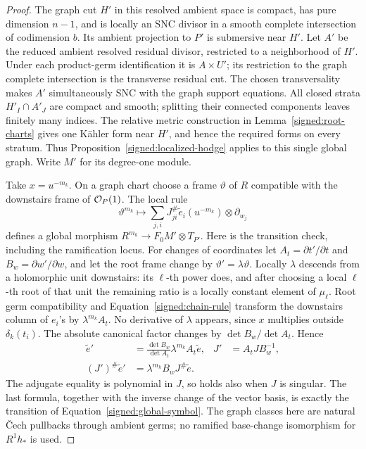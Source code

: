 \begin{proof}
The graph cut \(H'\) in this resolved ambient space is compact,
has pure dimension \(n-1\), and is locally an SNC divisor in
a smooth complete intersection of codimension \(b\).  Its
ambient projection to \(P'\) is submersive near \(H'\).
Let \(A'\) be the reduced ambient resolved residual divisor, restricted
to a neighborhood of \(H'\).  Under each product-germ identification
it is \(A\times U'\); its restriction to the graph complete intersection
is the transverse residual cut.  The chosen transversality makes \(A'\)
simultaneously SNC with the graph support equations.
All closed strata \(H'_I\cap A'_J\) are compact and smooth;
splitting their connected components leaves finitely many
indices.  The relative metric construction in
Lemma~\ref{signed:root-charts} gives one Kähler form near
\(H'\), and hence the required forms on every stratum.  Thus
Proposition~\ref{signed:localized-hodge} applies to this single
global graph.  Write \(M'\) for its degree-one module.

Take \(x=u^{-m_k}\).  On a graph chart choose a frame
\(\vartheta\) of \(R\) compatible with the downstairs frame
of \(\mathcal O_P(1)\).  The local rule
\begin{equation}\label{signed:global-symbol}
 \vartheta^{m_k}\longmapsto
 \sum_{j,i}J^\#_{ji}\widetilde e_i(u^{-m_k})
                    \otimes\partial_{w_j}
\end{equation}
defines a global morphism
\(R^{m_k}\to F_0M'\otimes T_{P'}\).  Here is the transition
check, including the ramification locus.  For changes of
coordinates let \(A_t=\partial t'/\partial t\) and
\(B_w=\partial w'/\partial w\), and let the root frame change
by \(\vartheta'=\lambda\vartheta\).  Locally \(\lambda\)
descends from a holomorphic unit downstairs: its \(\ell\)-th
power does, and after choosing a local \(\ell\)-th root of
that unit the remaining ratio is a locally constant element
of \(\mu_\ell\).  Root germ compatibility and
Equation~\eqref{signed:chain-rule} transform the downstairs
column of \(e_i\)'s by \(\lambda^{m_k}A_t\).  No derivative
of \(\lambda\) appears, since \(x\) multiplies outside
\(\delta_k(t_i)\).  The absolute canonical factor changes
by \(\det B_w/\det A_t\).  Hence
\[
\begin{aligned}
 \widetilde e'&=\frac{\det B_w}{\det A_t}\lambda^{m_k}A_t\widetilde e,
 &J'&=A_tJB_w^{-1},\\
 (J')^\#\widetilde e'&=\lambda^{m_k}B_wJ^\#\widetilde e.
\end{aligned}
\]
The adjugate equality is polynomial in \(J\), so holds also
when \(J\) is singular.  The last formula, together with the
inverse change of the vector basis, is exactly the transition
of Equation~\eqref{signed:global-symbol}.  The graph classes
here are natural Čech pullbacks through ambient germs; no
ramified base-change isomorphism for \(R^1h_*\) is used.


\end{proof}
